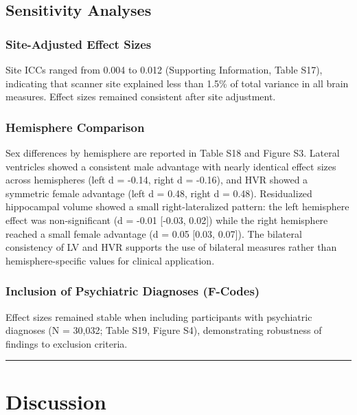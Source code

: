 \documentclass[
]{article}
\begin{document}
\subsection{Sensitivity Analyses}\label{sensitivity-analyses-1}

\subsubsection{Site-Adjusted Effect
Sizes}\label{site-adjusted-effect-sizes}

Site ICCs ranged from 0.004 to 0.012 (Supporting Information, Table
S17), indicating that scanner site explained less than 1.5\% of total
variance in all brain measures. Effect sizes remained consistent after
site adjustment.

\subsubsection{Hemisphere Comparison}\label{hemisphere-comparison-1}

Sex differences by hemisphere are reported in Table S18 and Figure S3.
Lateral ventricles showed a consistent male advantage with nearly
identical effect sizes across hemispheres (left d = -0.14, right d =
-0.16), and HVR showed a symmetric female advantage (left d = 0.48,
right d = 0.48). Residualized hippocampal volume showed a small
right-lateralized pattern: the left hemisphere effect was
non-significant (d = -0.01 {[}-0.03, 0.02{]}) while the right hemisphere
reached a small female advantage (d = 0.05 {[}0.03, 0.07{]}). The
bilateral consistency of LV and HVR supports the use of bilateral
measures rather than hemisphere-specific values for clinical
application.

\subsubsection{Inclusion of Psychiatric Diagnoses
(F-Codes)}\label{inclusion-of-psychiatric-diagnoses-f-codes}

Effect sizes remained stable when including participants with
psychiatric diagnoses (N = 30,032; Table S19, Figure S4), demonstrating
robustness of findings to exclusion criteria.

\begin{center}\rule{0.5\linewidth}{0.5pt}\end{center}

\section{Discussion}\label{discussion}
\end{document}
